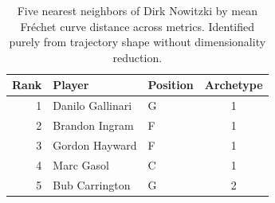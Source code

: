 \begin{table}[htbp]
  \centering\small
  \begin{tabular}{rllc}
    \toprule
    Rank & Player & Position & Archetype \\
    \midrule
    1 & Danilo Gallinari & G & 1 \\
    2 & Brandon Ingram & F & 1 \\
    3 & Gordon Hayward & F & 1 \\
    4 & Marc Gasol & C & 1 \\
    5 & Bub Carrington & G & 2 \\
    \bottomrule
  \end{tabular}
  \caption{Five nearest neighbors of Dirk Nowitzki by mean Fr\'{e}chet curve distance across metrics. Identified purely from trajectory shape without dimensionality reduction.}
  \label{tab:Dirk_Nowitzki_frechet_curve_neighbors}
\end{table}

